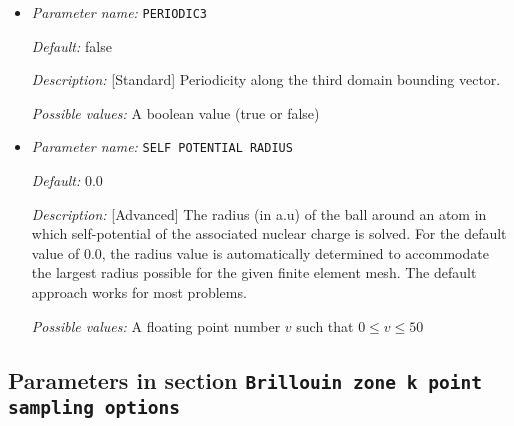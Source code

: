 \begin{itemize}


{\it Default:} false


{\it Description:} [Standard] Periodicity along the second domain bounding vector.


{\it Possible values:} A boolean value (true or false)
\item {\it Parameter name:} {\tt PERIODIC3}
\label{parameters:Boundary conditions/PERIODIC3}
\label{parameters:Boundary_20conditions/PERIODIC3}




{\it Default:} false


{\it Description:} [Standard] Periodicity along the third domain bounding vector.


{\it Possible values:} A boolean value (true or false)
\item {\it Parameter name:} {\tt SELF POTENTIAL RADIUS}
\label{parameters:Boundary conditions/SELF POTENTIAL RADIUS}
\label{parameters:Boundary_20conditions/SELF_20POTENTIAL_20RADIUS}




{\it Default:} 0.0


{\it Description:} [Advanced] The radius (in a.u) of the ball around an atom in which self-potential of the associated nuclear charge is solved. For the default value of 0.0, the radius value is automatically determined to accommodate the largest radius possible for the given finite element mesh. The default approach works for most problems.


{\it Possible values:} A floating point number $v$ such that $0 \leq v \leq 50$
\end{itemize}

\subsection{Parameters in section \tt Brillouin zone k point sampling options}
\label{parameters:Brillouin_20zone_20k_20point_20sampling_20options}

